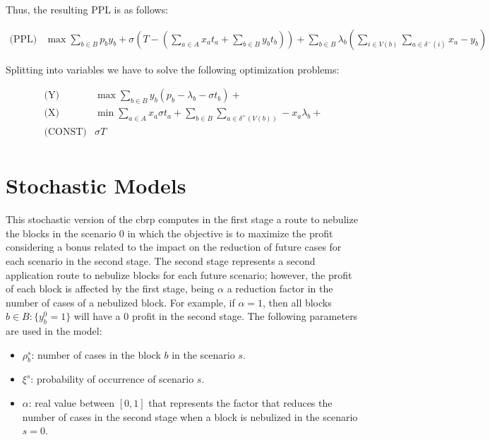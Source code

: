 Thus, the resulting PPL is as follows:

\begin{align*}
	\text{(PPL)} & \max \sum_{b \in B} p_{b} y_{b} + \sigma (T - (\sum_{a \in A} x_at_a + \sum_{b \in B} y_b t_b)) + \sum_{b \in B} \lambda_b (\sum_{i \in V(b)} \sum_{a \in \delta^{-}(i)}x_a - y_b) & 
\end{align*}

Splitting into variables we have to solve the following optimization problems:

\begin{align}
	\text{(Y)}     & \max \sum_{b \in B} y_{b} (p_b - \lambda_b - \sigma t_b) +                                           \\
	\text{(X)}     & \min \sum_{a \in A} x_{a} \sigma t_a + \sum_{b \in B} \sum_{a \in \delta^{+}(V(b))} -x_a \lambda_b + \\
	\text{(CONST)} & \sigma T                                                                                             \\
\end{align}






\section{Stochastic Models} \label{sec:cbrp-stochastic-models}

This stochastic version of the \gls{cbrp} computes in the
first stage a route to nebulize the blocks in the scenario $0$ in which the
objective is to maximize the profit considering a bonus related to the impact on
the reduction of future cases for each scenario in the second stage. The second
stage represents a second application route to nebulize blocks for each future scenario;
however, the profit of each block is affected by the first stage, being $\alpha$
a reduction factor in the number of cases of a nebulized block. For example, if
$\alpha = 1$, then all blocks $b \in B: \{y_{b}^{0} = 1\}$ will have a $0$
profit in the second stage. The following parameters are used in the model:

\begin{itemize}
	\item $\rho_{b}^{s}$: number of cases in the block $b$ in the scenario $s$.
	\item $\xi^{s}$: probability of occurrence of scenario $s$.
	\item $\alpha$: real value between $[0, 1]$ that represents the factor that
	      reduces the number of cases in the second stage when a block is nebulized in
	      the scenario $s = 0$.
\end{itemize}


